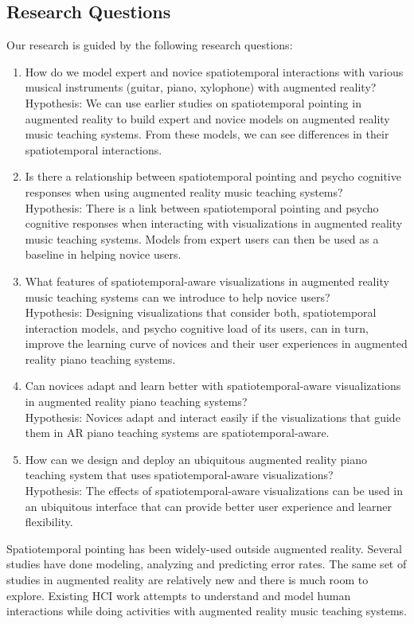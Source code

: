 \documentclass[manuscript,screen]{acmart}
\begin{document}
\subsection{Research Questions}
Our research is guided by the following research questions: 
\begin{enumerate}
    \item How do we model expert and novice spatiotemporal interactions with various musical instruments (guitar, piano, xylophone) with augmented reality? \\
    Hypothesis: We can use earlier studies on spatiotemporal pointing in augmented reality  to build expert and novice models on augmented reality music teaching systems. From these models, we can see differences in their spatiotemporal interactions.  
    \item Is there a relationship between spatiotemporal pointing and psycho cognitive responses when using augmented reality music teaching systems? \\
    Hypothesis: There is a link between spatiotemporal pointing and psycho cognitive responses when interacting with visualizations in augmented reality music teaching systems. Models from expert users can then be used as a baseline in helping novice users. 
    \item What features of spatiotemporal-aware visualizations in augmented reality music teaching systems can we introduce to help novice users?\\
    Hypothesis: Designing visualizations that consider both, spatiotemporal interaction models, and psycho cognitive load of its users,  can in turn,  improve the learning curve of novices and their user experiences in augmented reality piano teaching systems. 
    \item Can novices adapt and learn better with spatiotemporal-aware visualizations in augmented reality piano teaching systems? \\
    Hypothesis: Novices adapt and interact easily if the visualizations that guide them in AR piano teaching systems are spatiotemporal-aware.
    \item How can we design and deploy an ubiquitous augmented reality piano teaching system that uses spatiotemporal-aware visualizations?\\
    Hypothesis: The effects of spatiotemporal-aware visualizations can be used in an ubiquitous interface that can provide better user experience and learner flexibility. 

\end{enumerate}
Spatiotemporal pointing has been widely-used outside augmented reality. Several studies have done modeling, analyzing and predicting error rates. The same set of studies in augmented reality are relatively new and there is much room to explore. Existing HCI work attempts to understand and model human interactions while doing activities with augmented reality music teaching systems.\\
\end{document}
